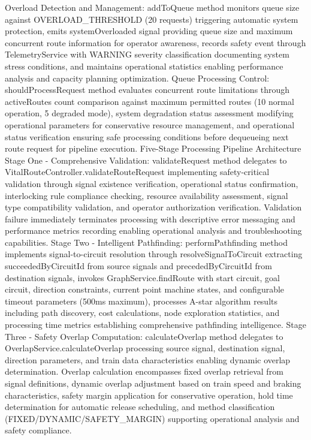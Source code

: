 Overload Detection and Management: addToQueue method monitors queue size against OVERLOAD_THRESHOLD (20 requests) triggering automatic system protection, emits systemOverloaded signal providing queue size and maximum concurrent route information for operator awareness, records safety event through TelemetryService with WARNING severity classification documenting system stress conditions, and maintains operational statistics enabling performance analysis and capacity planning optimization.
Queue Processing Control: shouldProcessRequest method evaluates concurrent route limitations through activeRoutes count comparison against maximum permitted routes (10 normal operation, 5 degraded mode), system degradation status assessment modifying operational parameters for conservative resource management, and operational status verification ensuring safe processing conditions before dequeueing next route request for pipeline execution.
Five-Stage Processing Pipeline Architecture
Stage One - Comprehensive Validation: validateRequest method delegates to VitalRouteController.validateRouteRequest implementing safety-critical validation through signal existence verification, operational status confirmation, interlocking rule compliance checking, resource availability assessment, signal type compatibility validation, and operator authorization verification. Validation failure immediately terminates processing with descriptive error messaging and performance metrics recording enabling operational analysis and troubleshooting capabilities.
Stage Two - Intelligent Pathfinding: performPathfinding method implements signal-to-circuit resolution through resolveSignalToCircuit extracting succeededByCircuitId from source signals and precededByCircuitId from destination signals, invokes GraphService.findRoute with start circuit, goal circuit, direction constraints, current point machine states, and configurable timeout parameters (500ms maximum), processes A-star algorithm results including path discovery, cost calculations, node exploration statistics, and processing time metrics establishing comprehensive pathfinding intelligence.
Stage Three - Safety Overlap Computation: calculateOverlap method delegates to OverlapService.calculateOverlap processing source signal, destination signal, direction parameters, and train data characteristics enabling dynamic overlap determination. Overlap calculation encompasses fixed overlap retrieval from signal definitions, dynamic overlap adjustment based on train speed and braking characteristics, safety margin application for conservative operation, hold time determination for automatic release scheduling, and method classification (FIXED/DYNAMIC/SAFETY_MARGIN) supporting operational analysis and safety compliance.

